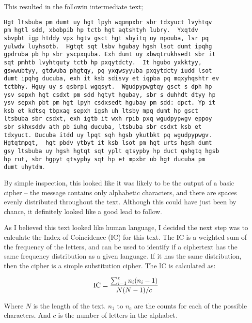 \documentclass[12pt,a4paper,twoside]{article}
\begin{document}
This resulted in the followin intermediate text; 

\begin{lstlisting}
Hgt ltsbuba pm dumt uy hgt lpyh wqpmpxbr sbr tdxyuct lvyhtqv
pm hgtl sdd, xbobpib hp tctb hgt aqtshtyh lubry.  Yxqtdv
sbvpbt igp htddy vpx hgtv gsct hgt sbyitq uy npouba, lsr pq
yulwdv luyhsotb.  Hgtqt sqt lsbv hgubay hgsh lsot dumt ipqhg
gpdruba pb hp sbr yscpxquba. Exh dumt uy xbwqtrukhsedt sbr it
sqt pmhtb lvyhtquty tctb hp pxqytdcty.  It hgubo yxkktyy,
gswwubtyy, gtdwuba phgtqy, pq yxqwsyyuba pxqytdcty iudd lsot
dumt ipqhg ducuba, exh it ksb sdisvy et iqpba pq mqxyhqshtr ev
tctbhy. Hguy uy s qsbrpl wgqsyt.  Wgudpypwgtqy gsct s dph hp
ysv sepxh hgt csdxt pm sdd hgtyt hgubay, sbr s duhhdt dtyy hp
ysv sepxh pbt pm hgt lpyh csdxsedt hgubay pm sdd: dpct. Yp it
ksb et kdtsq tbpxag sepxh igsh uh ltsby mpq dumt hp gsct
ltsbuba sbr csdxt, exh igtb it wxh rpib pxq wgudpypwgv eppoy
sbr skhxsddv ath pb iuhg ducuba, ltsbuba sbr csdxt ksb et
tdxyuct. Ducuba itdd uy lpqt sqh hgsb ykutbkt pq wgudpypwgv.
Hgtqtmpqt,  hgt pbdv ytbyt it ksb lsot pm hgt urts hgsh dumt
gsy ltsbuba uy hgsh hgtqt sqt yplt qtsypby hp duct qshgtq hgsb
hp rut, sbr hgpyt qtsypby sqt hp et mpxbr ub hgt ducuba pm
dumt uhytdm.
\end{lstlisting}

By simple inspection, this looked like it was likely to be the output of a
basic cipher -- the message contains only alphabetic characters, and there are
spaces evenly distributed throughout the text. Although this could have just
been by chance, it definitely looked like a good lead to follow.

As I believed this text looked like human language, I decided the next step was to calculate the Index of Coincidence (IC) for this text. The IC is a weighted sum of the frequency of the letters, and can be used to identify if a ciphertext has the same frequency distribution as a given language. If it has the same distribution, then the cipher is a simple substitution cipher. The IC is calculated as:

$$
\textup{IC} =  \frac{\sum_{i=1}^{c} n_i(n_i -1)}{N(N - 1)/c}
$$

Where $N$ is the length of the text. $n_1$ to $n_c$ are the counts
for each of the possible characters. And $c$ is the number of
letters in the alphabet. 
\end{document}
